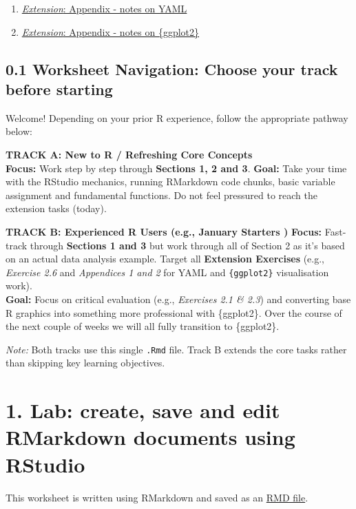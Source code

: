 \documentclass[
]{article}
\providecommand{\tightlist}{%
  \setlength{\itemsep}{0pt}\setlength{\parskip}{0pt}}
\begin{document}
\begin{enumerate}
\def\labelenumi{\Alph{enumi}.}
\tightlist
\item
  \hyperref[YAML_appendix]{\emph{Extension}: Appendix - notes on YAML}\\
\item
  \hyperref[ggplot_appendix]{\emph{Extension}: Appendix - notes on
  \{ggplot2\}}
\end{enumerate}

\subsection{0.1 Worksheet Navigation: Choose your track before
starting}\label{worksheet-navigation-choose-your-track-before-starting}

Welcome! Depending on your prior R experience, follow the appropriate
pathway below:

\textbf{TRACK A: New to R / Refreshing Core Concepts}\\
\textbf{Focus:} Work step by step through \textbf{Sections 1, 2 and 3}.
\textbf{Goal:} Take your time with the RStudio mechanics, running
RMarkdown code chunks, basic variable assignment and fundamental
functions. Do not feel pressured to reach the extension tasks (today).

\textbf{TRACK B: Experienced R Users (e.g., January Starters )}
\textbf{Focus:} Fast-track through \textbf{Sections 1 and 3} but work
through all of Section 2 as it's based on an actual data analysis
example. Target all \textbf{Extension Exercises} (e.g., \emph{Exercise
2.6} and \emph{Appendices 1 and 2} for YAML and \texttt{\{ggplot2\}}
visualisation work).\\
\textbf{Goal:} Focus on critical evaluation (e.g., \emph{Exercises 2.1
\& 2.3}) and converting base R graphics into something more professional
with \{ggplot2\}. Over the course of the next couple of weeks we will
all fully transition to \{ggplot2\}.

\emph{Note:} Both tracks use this single \texttt{.Rmd} file. Track B
extends the core tasks rather than skipping key learning objectives.

\section{1. Lab: create, save and edit RMarkdown documents using
RStudio}\label{WS1}

This worksheet is written using RMarkdown and saved as an
\href{https://blog.rstudio.com/2016/10/05/r-notebooks/}{RMD file}.
\end{document}
